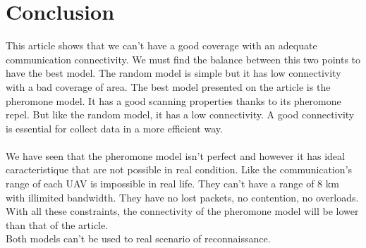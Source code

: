 \chapter{Conclusion}

This article shows that we can't have a good coverage with an adequate communication connectivity. We must find the balance between this two points to have the best model. The random model is simple but it has low connectivity with a bad coverage of area. The best model presented on the article is the pheromone model. It has a good scanning properties thanks to its pheromone repel. But like the random model, it has a low connectivity. A good connectivity is essential for collect data in a more efficient way.\\\\
We have seen that the pheromone model isn't perfect and however it has ideal caracteristique that are not possible in real condition. Like the communication's range of each UAV is impossible in real life. They can't have a range of 8 km with illimited bandwidth. They have no lost packets,  no contention, no overloads. With all these constraints, the connectivity of the pheromone model will be lower than that of the article.\\
Both models can't be used to real scenario of reconnaissance.